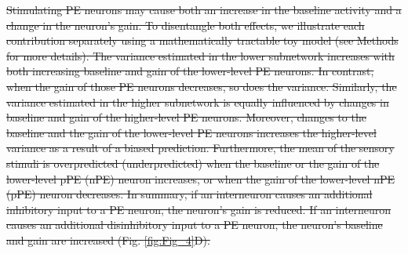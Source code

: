\documentclass[10pt,a4paper]{article}
\providecommand{\DIFdeltex}[1]{{\protect\color{red}\sout{#1}}}                      %
\providecommand{\DIFdelbegin}{} %
\providecommand{\DIFdel}[1]{\texorpdfstring{\DIFdeltex{#1}}{}} %
\newcommand{\DIFscaledelfig}{0.5}
\newlength{\DIFdelgraphicswidth} %
\newlength{\DIFdelgraphicsheight} %
\newcommand{\DIFdelincludegraphics}[2][]{%
\sbox{\DIFdelgraphicsbox}{\DIFOincludegraphics[#1]{#2}}%
\settoboxwidth{\DIFdelgraphicswidth}{\DIFdelgraphicsbox} %
\settoboxtotalheight{\DIFdelgraphicsheight}{\DIFdelgraphicsbox} %
\scalebox{\DIFscaledelfig}{%
\parbox[b]{\DIFdelgraphicswidth}{\usebox{\DIFdelgraphicsbox}\\[-\baselineskip] \rule{\DIFdelgraphicswidth}{0em}}\llap{\resizebox{\DIFdelgraphicswidth}{\DIFdelgraphicsheight}{%
\setlength{\unitlength}{\DIFdelgraphicswidth}%
\begin{picture}(1,1)%
\thicklines\linethickness{2pt} %
{\color[rgb]{1,0,0}\put(0,0){\framebox(1,1){}}}%
{\color[rgb]{1,0,0}\put(0,0){\line( 1,1){1}}}%
{\color[rgb]{1,0,0}\put(0,1){\line(1,-1){1}}}%
\end{picture}%
}\hspace*{3pt}}} %
} %
\DeclareRobustCommand{\DIFdelbegin}{\DIFOdelbegin \let\includegraphics\DIFdelincludegraphics} %
\begin{document}
\DIFdelbegin \DIFdel{Stimulating PE neurons may cause both an increase in the baseline activity and a change in the neuron's gain. To disentangle both effects, we illustrate each contribution separately using a mathematically tractable toy model (see Methods for more details). The variance estimated in the lower subnetwork increases with both increasing baseline and gain of the lower-level PE neurons. In contrast, when the gain of those PE neurons decreases, so does the variance. Similarly, the variance estimated in the higher subnetwork is equally influenced by changes in baseline and gain of the higher-level PE neurons. Moreover, changes to the baseline and the gain of the lower-level PE neurons increases the higher-level variance as a result of a biased prediction. Furthermore, the mean of the sensory stimuli is overpredicted (underpredicted) when the baseline or the gain of the lower-level pPE (nPE) neuron increases, or when the gain of the lower-level nPE (pPE) neuron decreases. In summary, if an interneuron causes an additional inhibitory input to a PE neuron, the neuron's gain is reduced. If an interneuron causes an additional disinhibitory input to a PE neuron, the neuron's baseline and gain are increased (Fig. \ref{fig:Fig_4}D).
}%
\end{document}
